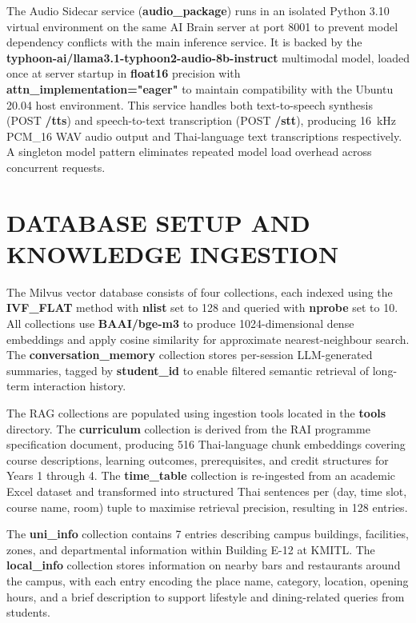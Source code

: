 The Audio Sidecar service (\textbf{audio\_package}) runs in an isolated Python 3.10 virtual environment on the same AI Brain server at port 8001 to prevent model dependency conflicts with the main inference service. It is backed by the \textbf{typhoon-ai/llama3.1-typhoon2-audio-8b-instruct} multimodal model, loaded once at server startup in \textbf{float16} precision with \textbf{attn\_implementation="eager"} to maintain compatibility with the Ubuntu 20.04 host environment. This service handles both text-to-speech synthesis (POST \textbf{/tts}) and speech-to-text transcription (POST \textbf{/stt}), producing 16~kHz PCM\_16 WAV audio output and Thai-language text transcriptions respectively. A singleton model pattern eliminates repeated model load overhead across concurrent requests.

\section{DATABASE SETUP AND KNOWLEDGE INGESTION}

The Milvus vector database consists of four collections, each indexed using the \textbf{IVF\_FLAT} method with \textbf{nlist} set to 128 and queried with \textbf{nprobe} set to 10. All collections use \textbf{BAAI/bge-m3} to produce 1024-dimensional dense embeddings and apply cosine similarity for approximate nearest-neighbour search. The \textbf{conversation\_memory} collection stores per-session LLM-generated summaries, tagged by \textbf{student\_id} to enable filtered semantic retrieval of long-term interaction history.

The RAG collections are populated using ingestion tools located in the \textbf{tools\/} directory. The \textbf{curriculum} collection is derived from the RAI programme specification document, producing 516 Thai-language chunk embeddings covering course descriptions, learning outcomes, prerequisites, and credit structures for Years 1 through 4. The \textbf{time\_table} collection is re-ingested from an academic Excel dataset and transformed into structured Thai sentences per (day, time slot, course name, room) tuple to maximise retrieval precision, resulting in 128 entries. 

The \textbf{uni\_info} collection contains 7 entries describing campus buildings, facilities, zones, and departmental information within Building E-12 at KMITL. The \textbf{local\_info} collection stores information on nearby bars and restaurants around the campus, with each entry encoding the place name, category, location, opening hours, and a brief description to support lifestyle and dining-related queries from students.

